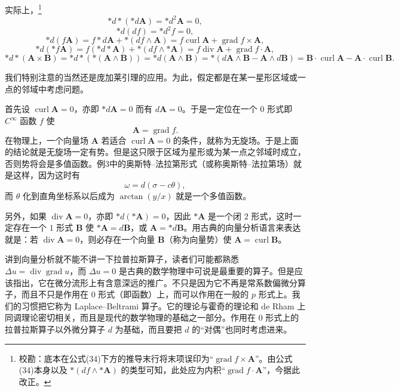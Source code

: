 实际上，\footnote{校勘：底本在公式(34)下方的推导末行将末项误印为“$\operatorname{grad}f\times\mathbf A$”。由公式(34)本身以及 $*(df\wedge *\mathbf A)$ 的类型可知，此处应为内积“$\operatorname{grad}f\cdot\mathbf A$”，今据此改正。}
\[
 *d*(*d\mathbf A)=*d^2\mathbf A=0,
\]
\[
 *d(df)=*d^2f=0,
\]
\[
 *d(f\mathbf A)=f*d\mathbf A+*(df\wedge\mathbf A)=f\operatorname{curl}\mathbf A+\operatorname{grad}f\times\mathbf A,
\]
\[
 *d(*f\mathbf A)=f(*d*\mathbf A)+*(df\wedge *\mathbf A)=f\operatorname{div}\mathbf A+\operatorname{grad}f\cdot\mathbf A,
\]
\[
 *d*(\mathbf A\times\mathbf B)=*d*( *(\mathbf A\wedge\mathbf B))=*d(\mathbf A\wedge\mathbf B)
 =*(d\mathbf A\wedge\mathbf B-\mathbf A\wedge d\mathbf B)
 =\mathbf B\cdot\operatorname{curl}\mathbf A-\mathbf A\cdot\operatorname{curl}\mathbf B.
\]

我们特别注意的当然还是庞加莱引理的应用。为此，假定都是在某一星形区域或一点的邻域中考虑问题。

首先设 $\operatorname{curl}\mathbf A=0$，亦即 $*d\mathbf A=0$ 而有 $d\mathbf A=0$。于是一定位在一个 $0$ 形式即 $C^\infty$ 函数 $f$ 使
\[
 \mathbf A=\operatorname{grad}f.
\]
在物理上，一个向量场 $\mathbf A$ 若适合 $\operatorname{curl}\mathbf A=0$ 的条件，就称为无旋场。于是上面的结论就是无旋场一定有势。但是这只限于区域为星形或为某一点之邻域时成立，否则势将会是多值函数。例3中的奥斯特--法拉第形式（或称奥斯特--法拉第场）就是这样，因为这时有
\[
 \omega=d(\sigma-c\theta),
\]
而 $\theta$ 化到直角坐标系以后成为 $\arctan(y/x)$ 就是一个多值函数。

另外，如果 $\operatorname{div}\mathbf A=0$，亦即 $*d(*\mathbf A)=0$，因此 $*\mathbf A$ 是一个闭 $2$ 形式，这时一定存在一个 $1$ 形式 $\mathbf B$ 使 $*\mathbf A=d\mathbf B$，或 $\mathbf A=*d\mathbf B$。用古典的向量分析语言来表达就是：若 $\operatorname{div}\mathbf A=0$，则必存在一个向量 $\mathbf B$（称为向量势）使 $\mathbf A=\operatorname{curl}\mathbf B$。

讲到向量分析就不能不讲一下拉普拉斯算子，读者们可能都熟悉 $\Delta u=\operatorname{div}\operatorname{grad}u$，而 $\Delta u=0$ 是古典的数学物理中可说是最重要的算子。但是应该指出，它在微分流形上有含意深远的推广。不只是因为它不再是常系数偏微分算子，而且不只是作用在 $0$ 形式（即函数）上，而可以作用在一般的 $p$ 形式上。我们的习惯把它称为 Laplace--Beltrami 算子。它的理论与霍奇的理论和 de Rham 上同调理论密切相关，而且是现代的数学物理的基础之一部分。作用在 $0$ 形式上的拉普拉斯算子以外微分算子 $d$ 为基础，而且要把 $d$ 的“对偶”也同时考虑进来。

